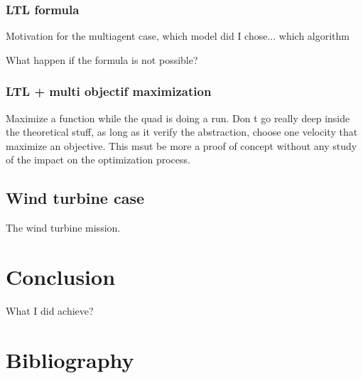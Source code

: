 \documentclass[notitlepage]{article}
\theoremstyle{named}
\begin{document}
\subsubsection{LTL formula}
Motivation for the multiagent case, which model did I chose... which algorithm

What happen if the formula is not possible?

\subsubsection{LTL + multi objectif maximization}

Maximize a function while the quad is doing a run.
Don t go really deep inside the theoretical stuff, as long as it verify the abstraction, choose one velocity that maximize an objective.
This msut be more a proof of concept without any study of the impact on the optimization process.

\subsection{Wind turbine case}
The wind turbine mission.


\section{Conclusion}
What I did achieve?


\section*{Bibliography}
\end{document}
